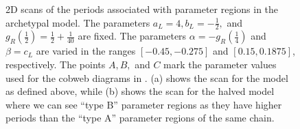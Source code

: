 \begin{figure}
	\centering
	\caption[2D scans of the periods associated with parameter regions in the archetypal model]{
		2D scans of the periods associated with parameter regions in the archetypal model.
		The parameters $a_L = 4, b_L = -\frac{1}{2},$ and $g_R\left(\frac{1}{2}\right) = \frac{1}{2} + \frac{1}{40}$ are fixed.
		The parameters $\alpha = -g_R\left(\frac{1}{4}\right)$ and $\beta = c_L$ are varied in the ranges $[-0.45, -0.275]$ and $[0.15, 0.1875]$, respectively.
		The points $A, B,$ and $C$ mark the parameter values used for the cobweb diagrams in .
		(a) shows the scan for the model as defined above, while (b) shows the scan for the halved model where we can see ``type B'' parameter regions as they have higher periods than the ``type A'' parameter regions of the same chain.
	}
	\label{fig:setup.arch.period}
\end{figure}

